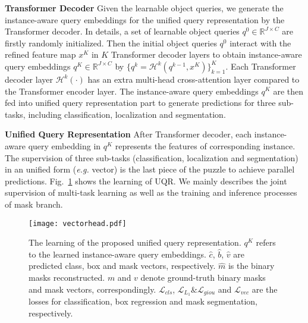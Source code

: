 \documentclass{article}
\begin{document}
\textbf{Transformer Decoder}
Given the learnable object queries, we generate the instance-aware query embeddings for the unified query representation by the Transformer decoder. In details, a set of learnable object queries $q^{0}\in\mathbb{R}^{J \times C}$ are firstly randomly initialized. Then the initial object queries $q^{0}$ interact with the refined feature map $x^{K}$ in $K$ Transformer decoder layers to obtain instance-aware query embeddings $q^{K}\in\mathbb{R}^{J \times C}$ by $\{q^{k}=\mathcal{H}^{k}(q^{k-1}, x^{K})\}^{K}_{k=1}$. Each Transformer decoder layer $\mathcal{H}^{k}(\cdot)$ has an extra multi-head cross-attention layer compared to the Transformer encoder layer. The instance-aware query embeddings $q^{K}$ are then fed into unified query representation part to generate predictions for three sub-tasks, including classification, localization and segmentation.

\textbf{Unified Query Representation}
After Transformer decoder, each instance-aware query embedding in $q^{K}$ represents the features of corresponding instance. The supervision of three sub-tasks (classification, localization and segmentation) in an unified form (\textit{e.g.} vector) is the last piece of the puzzle to achieve parallel predictions. Fig.~\ref{fig:vector_head} shows the learning of UQR. We mainly describes the joint supervision of multi-task learning as well as the training and inference processes of mask branch.

\begin{figure}[h]
\centering
\texttt{[image: vectorhead.pdf]}
\caption{The learning of the proposed unified query representation. $q^{K}$ refers to the learned instance-aware query embeddings. $\hat{c}$, $\hat{b}$, $\hat{v}$ are predicted class, box and mask vectors, respectively. $\hat{m}$ is the binary masks reconstructed. $m$ and $v$ denote ground-truth binary masks and mask vectors, correspondingly. $\mathcal{L}_{cls}$, $\mathcal{L}_{L_{1}}\&\mathcal{L}_{giou}$ and $\mathcal{L}_{vec}$ are the losses for classification, box regression and mask segmentation, respectively.}
\label{fig:vector_head}
\end{figure}
\end{document}
